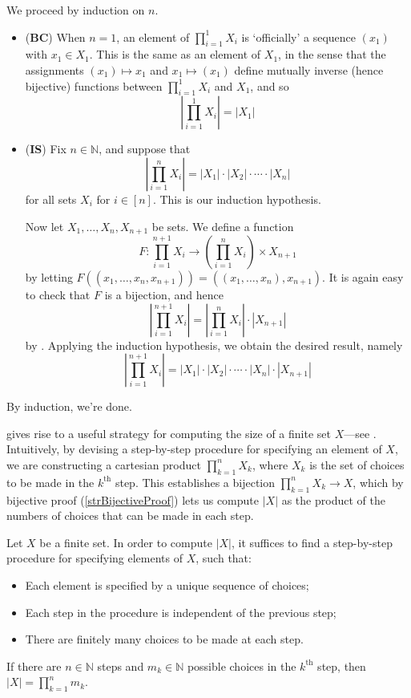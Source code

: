 \begin{cproof}
We proceed by induction on $n$.
\begin{itemize}
\item (\textbf{BC}) When $n=1$, an element of $\prod_{i=1}^1 X_i$ is `officially' a sequence $(x_1)$ with $x_1 \in X_1$. This is the same as an element of $X_1$, in the sense that the assignments $(x_1) \mapsto x_1$ and $x_1 \mapsto (x_1)$ define mutually inverse (hence bijective) functions between $\prod_{i=1}^1 X_i$ and $X_1$, and so
\[ \left| \prod_{i=1}^1 X_i \right| = |X_1| \]
\item (\textbf{IS}) Fix $n \in \mathbb{N}$, and suppose that
\[ \displaystyle \left| \prod_{i=1}^n X_i \right| = |X_1| \cdot |X_2| \cdot \cdots \cdot |X_n| \]
for all sets $X_i$ for $i \in [n]$. This is our induction hypothesis.

Now let $X_1, \dots, X_n, X_{n+1}$ be sets. We define a function
\[ F : \prod_{i=1}^{n+1} X_i \to \left(\prod_{i=1}^n X_i\right) \times X_{n+1} \]
by letting $F((x_1, \dots, x_n, x_{n+1})) = ((x_1, \dots, x_n), x_{n+1})$. It is again easy to check that $F$ is a bijection, and hence
\[ \left| \prod_{i=1}^{n+1} X_i \right| = \left| \prod_{i=1}^n X_i \right| \cdot |X_{n+1}| \]
by . Applying the induction hypothesis, we obtain the desired result, namely
\[ \left| \prod_{i=1}^{n+1} X_i \right| = |X_1| \cdot |X_2| \cdot \cdots \cdot |X_n| \cdot |X_{n+1}| \]
\end{itemize}
By induction, we're done.
\end{cproof}

 gives rise to a useful strategy for computing the size of a finite set $X$---see . Intuitively, by devising a step-by-step procedure for specifying an element of $X$, we are constructing a cartesian product $\prod_{k=1}^n X_k$, where $X_k$ is the set of choices to be made in the $k^{\text{th}}$ step. This establishes a bijection $\prod_{k=1}^n X_k \to X$, which by bijective proof (\ref{strBijectiveProof}) lets us compute $|X|$ as the product of the numbers of choices that can be made in each step.

\begin{strategy}
\label{strMultiplicationPrincipleIndependent}
Let $X$ be a finite set. In order to compute $|X|$, it suffices to find a step-by-step procedure for specifying elements of $X$, such that:
\vspace{5pt}
\begin{itemize}
\item Each element is specified by a unique sequence of choices;
\item Each step in the procedure is independent of the previous step;
\item There are finitely many choices to be made at each step.
\end{itemize}
\vspace{5pt}
If there are $n \in \mathbb{N}$ steps and $m_k \in \mathbb{N}$ possible choices in the $k^{\text{th}}$ step, then $|X| = \prod_{k=1}^n m_k$.
\end{strategy}

